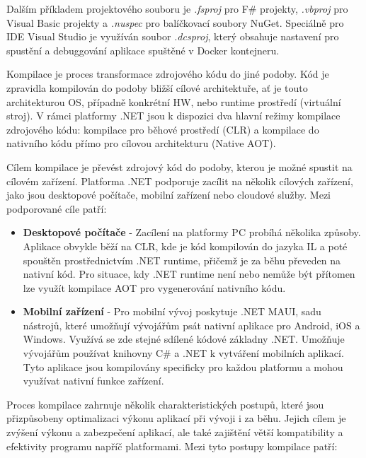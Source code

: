 Dalším příkladem projektového souboru je \emph{.fsproj} pro F\# projekty, \emph{.vbproj} pro Visual Basic projekty a \emph{.nuspec} pro balíčkovací soubory NuGet. Speciálně pro IDE Visual Studio je využíván soubor \emph{.dcsproj}, který obsahuje nastavení pro spustění a debuggování aplikace spuštěné v Docker kontejneru. 


Kompilace je proces transformace zdrojového kódu do jiné podoby. Kód je zpravidla kompilován do podoby bližší cílové architektuře, ať je touto architekturou OS, případně konkrétní HW, nebo runtime prostředí (virtuální stroj). V rámci platformy .NET jsou k dispozici dva hlavní režimy kompilace zdrojového kódu: kompilace pro běhové prostředí (CLR) a kompilace do nativního kódu přímo pro cílovou architekturu (Native AOT).


Cílem kompilace je převést zdrojový kód do podoby, kterou je možné spustit na cílovém zařízení. Platforma .NET podporuje zacílit na několik cílových zařízení, jako jsou desktopové počítače, mobilní zařízení nebo cloudové služby. Mezi podporované cíle patří:

\begin{itemize}
    \item \textbf{Desktopové počítače} - Zacílení na platformy PC probíhá několika způsoby. Aplikace obvykle běží na CLR, kde je kód kompilován do jazyka IL a poté spouštěn prostřednictvím .NET runtime, přičemž je za běhu převeden na nativní kód. Pro situace, kdy .NET runtime není nebo nemůže být přítomen lze využít kompilace AOT pro vygenerování nativního kódu.
    \item \textbf{Mobilní zařízení} - Pro mobilní vývoj poskytuje .NET MAUI, sadu nástrojů, které umožňují vývojářům psát nativní aplikace pro Android, iOS a Windows. Využívá se zde stejné sdílené kódové základny .NET. Umožňuje vývojářům používat knihovny C\# a .NET k vytváření mobilních aplikací. Tyto aplikace jsou kompilovány specificky pro každou platformu a mohou využívat nativní funkce zařízení.
\end{itemize}


Proces kompilace zahrnuje několik charakteristických postupů, které jsou přizpůsobeny optimalizaci výkonu aplikací při vývoji i za běhu. Jejich cílem je zvýšení výkonu a zabezpečení aplikací, ale také zajištění větší kompatibility a efektivity programu napříč platformami. Mezi tyto postupy kompilace patří:

